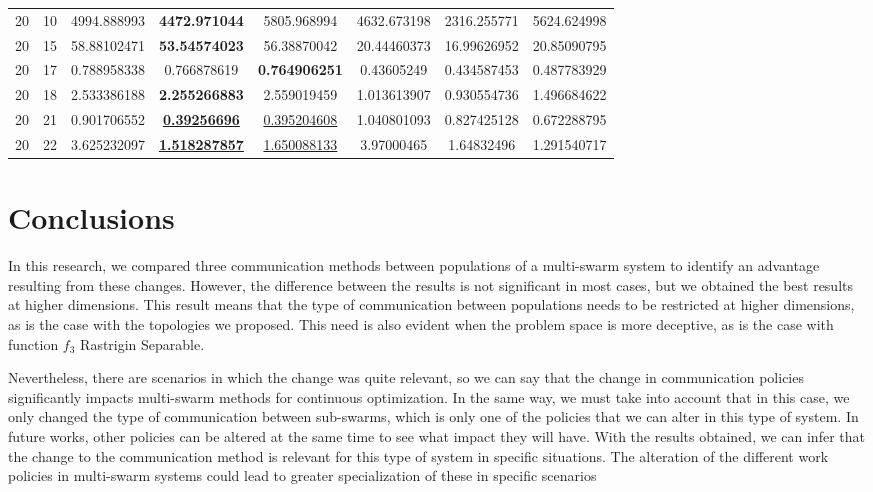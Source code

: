 \documentclass[runningheads]{llncs}
\begin{document}
\begin{table}[h!tb]
{\begin{tabular}{|c|c||c|c|c||c|c|c|}
20	&	10	&	4994.888993	&	\textbf{4472.971044}	&	5805.968994	&	4632.673198	&	2316.255771	&	5624.624998	\\
20	&	15	&	58.88102471	&	\textbf{53.54574023}	&	56.38870042	&	20.44460373	&	16.99626952	&	20.85090795	\\
20	&	17	&	0.788958338	&	0.766878619	&	\textbf{0.764906251}	&	0.43605249	&	0.434587453	&	0.487783929	\\
20	&	18	&	2.533386188	&	\textbf{2.255266883}	&	2.559019459	&	1.013613907	&	0.930554736	&	1.496684622	\\
20	&	21	&	0.901706552	&	\underline{\textbf{0.39256696}}	&	\underline{0.395204608}	&	1.040801093	&	0.827425128	&	0.672288795	\\
20	&	22	&	3.625232097	&	\underline{\textbf{1.518287857}}	&	\underline{1.650088133}	&	3.97000465	&	1.64832496	&	1.291540717	\\

    \hline
    \end{tabular}}
    \label{tab:my_label}
\end{table}
\hfill\break





\section{Conclusions}



In this research, we compared three communication methods between populations of
a multi-swarm system to identify an advantage resulting from these changes.
However, the difference between the results is not significant in most cases,
but we obtained the best results at higher dimensions. This result means that
the type of communication between populations needs to be restricted at higher
dimensions, as is the case with the topologies we proposed. This need is also
evident when the problem space is more deceptive, as is the case with function
$f_{3}$ Rastrigin Separable. 

Nevertheless, there are scenarios in which the change was quite relevant, so we
can say that the change in communication policies significantly impacts
multi-swarm methods for continuous optimization. In the same way, we must take
into account that in this case, we only changed the type of communication
between sub-swarms, which is only one of the policies that we can alter in this
type of system. In future works, other policies can be altered at the same time
to see what impact they will have. With the results obtained, we can infer that
the change to the communication method is relevant for this type of system in
specific situations. The alteration of the different work policies in
multi-swarm systems could lead to greater specialization of these in specific
scenarios
\end{document}
